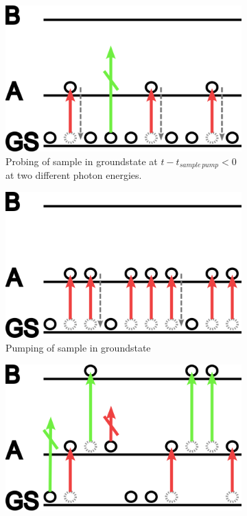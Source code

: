 \documentclass[twoside,openright]{scrreprt}
\begin{document}
\begin{figure}[hbtp]
\centering
\begin{subfigure}[t]{0.3\textwidth}
\centering
\includegraphics[width=\linewidth]{images/TA-explanationProbeOnly.png}
\caption{Probing of sample in groundstate at $t-t_{sample\, pump} < 0$ at two different photon energies.\label{fig:probeOnly}}
\end{subfigure}
\hfill
\begin{subfigure}[t]{0.3\textwidth}
\centering
\includegraphics[width=\linewidth]{images/TA-explanationPumpOnly.png}
\caption{Pumping of sample in groundstate}
\end{subfigure}
\hfill
\begin{subfigure}[t]{0.3\textwidth}
\centering
\includegraphics[width=\linewidth]{images/TA-explanation-probe-after-pump.png}

\end{subfigure}
\end{figure}
\end{document}
